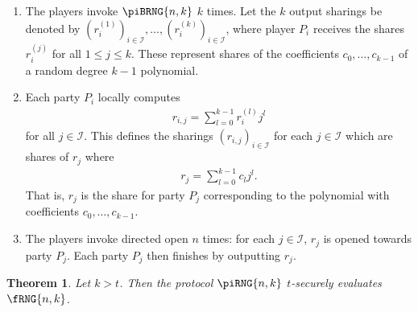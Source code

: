 \documentclass{article}
\newtheorem{theorem}{Theorem}
\theoremstyle{remark}
\begin{document}
\begin{enumerate}
	\item\label{enum:rngCoeff} The players invoke $\piBRNG{n,k}$ $k$ times. Let
		the $k$ output sharings be denoted by ${\left(r_i^{(1)}\right)}_{i \in
		\mathcal{I}}, \ldots, {\left(r_i^{(k)}\right)}_{i \in \mathcal{I}}$,
		where player $P_i$ receives the shares $r_i^{(j)}$ for all $1 \le j \le
		k$. These represent shares of the coefficients $c_0, \ldots, c_{k-1}$
		of a random degree $k-1$ polynomial.

	\item\label{enum:rngrij} Each party $P_i$ locally computes
		\begin{align*}
			r_{i,j} = \sum_{l=0}^{k-1} r_i^{(l)} j^l
		\end{align*}
		for all $j \in \mathcal{I}$. This defines the sharings ${(r_{i,j})}_{i
		\in \mathcal{I}}$ for each $j \in \mathcal{I}$ which are shares of
		$r_j$ where
		\begin{align*}
			r_j = \sum_{l=0}^{k-1} c_l j^l.
		\end{align*}
		That is, $r_j$ is the share for party $P_j$ corresponding to the
		polynomial with coefficients $c_0, \ldots, c_{k-1}$.

	\item\label{enum:rngDO} The players invoke directed open $n$ times: for
		each $j \in \mathcal{I}$, $r_j$ is opened towards party $P_j$. Each
		party $P_j$ then finishes by outputting $r_j$.
\end{enumerate}

\begin{theorem}\label{thm:rng}
	Let $k > t$. Then the protocol $\piRNG{n,k}$ $t$-securely evaluates
	$\fRNG{n,k}$.
\end{theorem}
\end{document}
